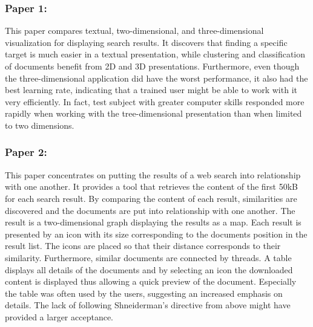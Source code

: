 \subsubsection{Paper 1: \cite{search:sebrechts}}
This paper compares textual, two-dimensional, and three-dimensional visualization for displaying search results. It discovers that finding a specific target is much easier in a textual presentation, while clustering and classification of documents benefit from 2D and 3D presentations. Furthermore, even though the three-dimensional application did have the worst performance, it also had the best learning rate, indicating that a trained user might be able to work with it very efficiently. In fact, test subject with greater computer skills responded more rapidly when working with the tree-dimensional presentation than when limited to two dimensions.

\subsubsection{Paper 2: \cite{search:zaina}}
This paper concentrates on putting the results of a web search into relationship with one another. It provides a tool that retrieves the content of the first 50kB for each search result. By comparing the content of each result, similarities are discovered and the documents are put into relationship with one another. The result is a two-dimensional graph displaying the results as a map. Each result is presented by an icon with its size corresponding to the documents position in the result list. The icons are placed so that their distance corresponds to their similarity. Furthermore, similar documents are connected by threads. A table displays all details of the documents and by selecting an icon the downloaded content is displayed thus allowing a quick preview of the document. Especially the table was often used by the users, suggesting an increased emphasis on details. The lack of following Shneiderman's directive from above might have provided a larger acceptance.